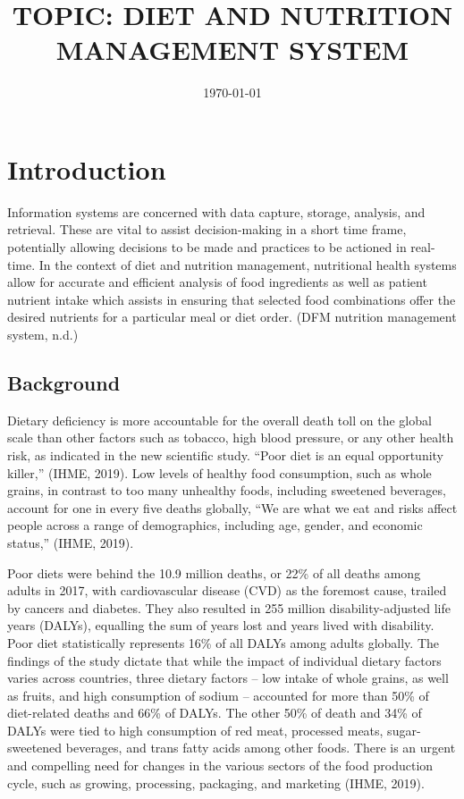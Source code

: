 \documentclass{article}
\begin{document}
\title{TOPIC:  DIET AND NUTRITION MANAGEMENT SYSTEM }
\author{}
\date{\today}
\maketitle 

\section{Introduction}
\label{Introducion}
Information systems are concerned with data capture, storage, analysis, and retrieval. These are vital to assist decision-making in a short time frame, potentially allowing decisions to be made and practices to be actioned in real-time.  In the context of diet and nutrition management, nutritional health systems allow for accurate and efficient analysis of food ingredients as well as patient nutrient intake which assists in ensuring that selected food combinations offer the desired nutrients for a particular meal or diet order. (DFM nutrition management system, n.d.)
\subsection{Background}
Dietary deficiency is more accountable for the overall death toll on the global scale than other factors such as tobacco, high blood pressure, or any other health risk, as indicated in the new scientific study. “Poor diet is an equal opportunity killer,” (IHME, 2019). Low levels of healthy food consumption, such as whole grains, in contrast to too many unhealthy foods, including sweetened beverages, account for one in every five deaths globally, “We are what we eat and risks affect people across a range of demographics, including age, gender, and economic status,” (IHME, 2019). 

Poor diets were behind the 10.9 million deaths, or 22\% of all deaths among adults in 2017, with cardiovascular disease (CVD) as the foremost cause, trailed by cancers and diabetes. They also resulted in 255 million disability-adjusted life years (DALYs), equalling the sum of years lost and years lived with disability. Poor diet statistically represents 16\% of all DALYs among adults globally. The findings of the study dictate that while the impact of individual dietary factors varies across countries, three dietary factors – low intake of whole grains, as well as fruits, and high consumption of sodium – accounted for more than 50\% of diet-related deaths and 66\% of DALYs. The other 50\% of death and 34\% of DALYs were tied to high consumption of red meat, processed meats, sugar-sweetened beverages, and trans fatty acids among other foods. There is an urgent and compelling need for changes in the various sectors of the food production cycle, such as growing, processing, packaging, and marketing (IHME, 2019).
\end{document}
